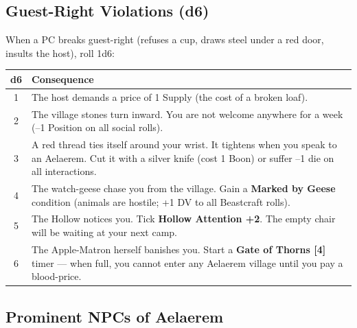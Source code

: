 \documentclass[12pt,oneside]{book}
\begin{document}
\subsection*{Guest-Right Violations (d6)}
When a PC breaks guest-right (refuses a cup, draws steel under a red door, insults the host), roll 1d6:
\begin{center}
\begin{tabular}{|c|l|}
\hline
\textbf{d6} & \textbf{Consequence} \\
\hline
1 & The host demands a price of 1 Supply (the cost of a broken loaf). \\
2 & The village stones turn inward. You are not welcome anywhere for a week (--1 Position on all social rolls). \\
3 & A red thread ties itself around your wrist. It tightens when you speak to an Aelaerem. Cut it with a silver knife (cost 1 Boon) or suffer --1 die on all interactions. \\
4 & The watch-geese chase you from the village. Gain a \textbf{Marked by Geese} condition (animals are hostile; +1 DV to all Beastcraft rolls). \\
5 & The Hollow notices you. Tick \textbf{Hollow Attention +2}. The empty chair will be waiting at your next camp. \\
6 & The Apple-Matron herself banishes you. Start a \textbf{Gate of Thorns [4]} timer --- when full, you cannot enter any Aelaerem village until you pay a blood-price. \\
\hline
\end{tabular}
\end{center}

\subsection*{Prominent NPCs of Aelaerem}
\label{sec:aelaerem-npcs}
\end{document}
